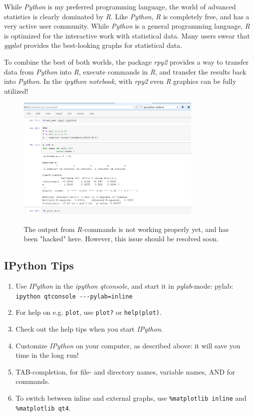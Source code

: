 While \emph{Python} is my preferred programming language, the world of advanced statistics is clearly dominated by \emph{R}. Like \emph{Python}, \emph{R} is completely free, and has a very active user community. While \emph{Python} is a general programming language, \emph{R} is optimized for the interactive work with statistical data. Many users swear that \emph{ggplot} provides the best-looking graphs for statistical data.

To combine the best of both worlds, the package \emph{rpy2} provides a way to transfer data from \emph{Python} into \emph{R}, execute commands in \emph{R}, and transfer the results back into \emph{Python}. In the \emph{ipython notebook}, with \emph{rpy2} even \emph{R} graphics can be fully utilized!

\begin{figure}
  \centering
  \includegraphics[width=0.8\textwidth]{../Images/ipython-rmagic.png}\\
  \caption{The output from \emph{R}-commands is not working properly yet, and has been "hacked" here. However, this issue should be resolved soon.}
\end{figure}

\subsection{IPython Tips}

\begin{enumerate}
    \item Use \emph{IPython} in the \emph{ipython qtconsole}, and start it in \emph{pylab}-mode: pylab: \lstinline{ipython qtconsole ---pylab=inline}
    \item For help on e.g. \lstinline{plot}, use \lstinline{plot?} or \lstinline{help(plot)}.
    \item Check out the help tips when you start \emph{IPython}.
    \item Customize \emph{IPython} on your computer, as described above: it will save you time in the long run!
    \item TAB-completion, for file- and directory names, variable names, AND for commands.
    \item To switch between inline and external graphs, use \; \lstinline{%matplotlib inline} and \; \lstinline{%matplotlib qt4}.
\end{enumerate}

